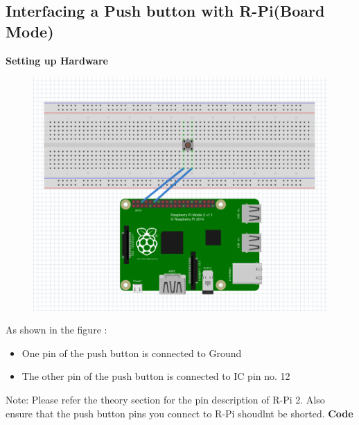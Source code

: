 \documentclass[11pt,a4paper]{article}
\begin{document}
	 \subsection{Interfacing a Push button with R-Pi(Board Mode)}
	 \textbf{Setting up Hardware}
	  \begin{figure}[h!]
	  	\includegraphics[scale=0.6]{pb.png}
	  	\centering
	  \end{figure}
	   As shown in the figure :
	   \begin{itemize}
	   	\item One pin of the push button is connected to Ground
	   	\item The other pin of the push button is connected to IC pin no. 12
	   \end{itemize}
	    Note: Please refer the theory section for the pin description of R-Pi 2. Also ensure that the push button pins you connect to R-Pi shoudlnt be shorted.
	    \vspace{0.3cm}
	    \newline
	    \textbf{Code}
	    
	 
	 \newpage
\end{document}
